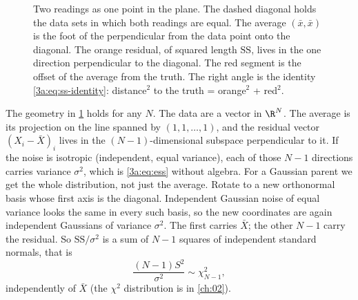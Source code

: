 \begin{figure}[htbp]
\centering
{}
\caption{Two readings as one point in the plane. The dashed diagonal holds
the data sets in which both readings are equal. The average $(\bar x,\bar x)$
is the foot of the perpendicular from the data point onto the diagonal. The
orange residual, of squared length $\mathrm{SS}$, lives in the one direction
perpendicular to the diagonal. The red segment is the offset of the average
from the truth. The right angle is the identity
\eqref{3a:eq:ss-identity}: distance$^2$ to the truth = orange$^2$ +
red$^2$.}
\label{3a:fig:projection}
\end{figure}

The geometry in \cref{3a:fig:projection} holds for any $N$. The data are a
vector in $\R^N$. The average is its projection on the line spanned by
$(1,1,\dots,1)$, and the residual vector $(X_i-\bar X)_i$ lives in the
$(N-1)$-dimensional subspace perpendicular to it. If the noise is isotropic
(independent, equal variance), each of those $N-1$ directions carries
variance $\sigma^2$, which is \eqref{3a:eq:ess} without algebra. For a
Gaussian parent we get the whole distribution, not just the average. Rotate
to a new orthonormal basis whose first axis is the diagonal. Independent
Gaussian noise of equal variance looks the same in every such basis, so the
new coordinates are again independent Gaussians of variance $\sigma^2$. The
first carries $\bar X$; the other $N-1$ carry the residual. So
$\mathrm{SS}/\sigma^2$ is a sum of $N-1$ squares of independent standard
normals, that is
\begin{equation}
  \frac{(N-1)S^2}{\sigma^2}\sim\chi^2_{N-1},
  \label{3a:eq:s2-chi2}
\end{equation}
independently of $\bar X$ (the $\chi^2$ distribution is in \cref{ch:02}).

